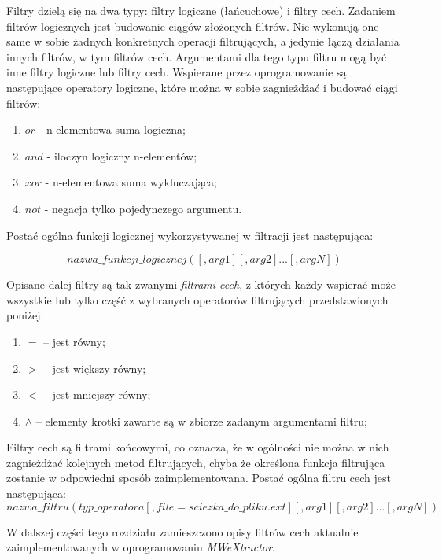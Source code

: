 \par
Filtry dzielą się na dwa typy: filtry logiczne (łańcuchowe) i filtry cech.
Zadaniem filtrów logicznych jest budowanie ciągów złożonych filtrów.
Nie wykonują one same w sobie żadnych konkretnych operacji filtrujących, a jedynie łączą działania innych filtrów, w tym filtrów cech.
Argumentami dla tego typu filtru mogą być inne filtry logiczne lub filtry cech.
Wspierane przez oprogramowanie są następujące operatory logiczne, które można w sobie zagnieżdżać i budować ciągi filtrów:
\begin{enumerate}
 \item $ or $ - n-elementowa suma logiczna;
 \item $ and $ - iloczyn logiczny n-elementów;
 \item $ xor $ - n-elementowa suma wykluczająca;
 \item $ not $ - negacja tylko pojedynczego argumentu.
\end{enumerate}

Postać ogólna funkcji logicznej wykorzystywanej w filtracji jest następująca:

$$ nazwa\_funkcji\_logicznej([,arg1][,arg2]...[,argN]) $$

\par
Opisane dalej filtry są tak zwanymi \emph{filtrami cech}, z których każdy wspierać może wszystkie lub tylko część z wybranych operatorów filtrujących przedstawionych poniżej:
\begin{enumerate}
 \item $ = $ -- jest równy;
 \item $ > $ -- jest większy równy;
 \item $ < $ -- jest mniejszy równy;
 \item $ \wedge $ -- elementy krotki zawarte są w zbiorze zadanym argumentami filtru;
\end{enumerate}

Filtry cech są filtrami końcowymi, co oznacza, że w ogólności nie można w nich zagnieżdżać kolejnych metod filtrujących, chyba że określona funkcja filtrująca zostanie w odpowiedni sposób zaimplementowana.
Postać ogólna filtru cech jest następująca:
$$ nazwa\_filtru(typ\_operatora[,file=sciezka\_do\_pliku.ext][,arg1][,arg2]...[,argN]) $$

W dalszej części tego rozdziału zamieszczono opisy filtrów cech aktualnie zaimplementowanych w oprogramowaniu \emph{MWeXtractor}.


